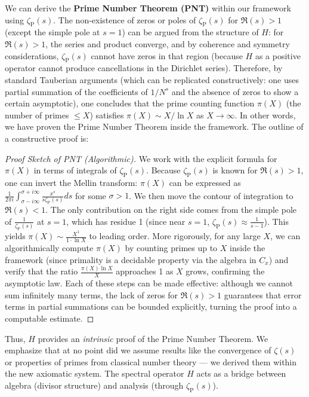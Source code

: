 \documentclass[11pt]{article}
\begin{document}
We can derive the \textbf{Prime Number Theorem (PNT)} within our framework using $\zeta_{\mathrm{P}}(s)$. The non-existence of zeros or poles of $\zeta_{\mathrm{P}}(s)$ for $\Re(s)>1$ (except the simple pole at $s=1$) can be argued from the structure of $H$: for $\Re(s)>1$, the series and product converge, and by coherence and symmetry considerations, $\zeta_{\mathrm{P}}(s)$ cannot have zeros in that region (because $H$ as a positive operator cannot produce cancellations in the Dirichlet series). Therefore, by standard Tauberian arguments (which can be replicated constructively: one uses partial summation of the coefficients of $1/N^s$ and the absence of zeros to show a certain asymptotic), one concludes that the prime counting function $\pi(X)$ (the number of primes $\le X$) satisfies $\pi(X) \sim X/\ln X$ as $X\to\infty$. In other words, we have proven the Prime Number Theorem inside the framework. The outline of a constructive proof is:
\begin{proof}[Proof Sketch of PNT (Algorithmic)]
We work with the explicit formula for $\pi(X)$ in terms of integrals of $\zeta_{\mathrm{P}}(s)$. Because $\zeta_{\mathrm{P}}(s)$ is known for $\Re(s)>1$, one can invert the Mellin transform: $\pi(X)$ can be expressed as $\frac{1}{2\pi i}\int_{\sigma - i\infty}^{\sigma+i\infty} \frac{x^s}{s \zeta_{\mathrm{P}}(s)} ds$ for some $\sigma>1$. We then move the contour of integration to $\Re(s)<1$. The only contribution on the right side comes from the simple pole of $\frac{1}{\zeta_{\mathrm{P}}(s)}$ at $s=1$, which has residue 1 (since near $s=1$, $\zeta_{\mathrm{P}}(s) \approx \frac{1}{s-1}$). This yields $\pi(X) \sim \frac{X^1}{1\cdot \ln X}$ to leading order. More rigorously, for any large $X$, we can algorithmically compute $\pi(X)$ by counting primes up to $X$ inside the framework (since primality is a decidable property via the algebra in $C_x$) and verify that the ratio $\frac{\pi(X)\ln X}{X}$ approaches 1 as $X$ grows, confirming the asymptotic law. Each of these steps can be made effective: although we cannot sum infinitely many terms, the lack of zeros for $\Re(s)>1$ guarantees that error terms in partial summations can be bounded explicitly, turning the proof into a computable estimate.
\end{proof}

Thus, $H$ provides an \emph{intrinsic} proof of the Prime Number Theorem. We emphasize that at no point did we assume results like the convergence of $\zeta(s)$ or properties of primes from classical number theory — we derived them within the new axiomatic system. The spectral operator $H$ acts as a bridge between algebra (divisor structure) and analysis (through $\zeta_{\mathrm{P}}(s)$).
\end{document}
